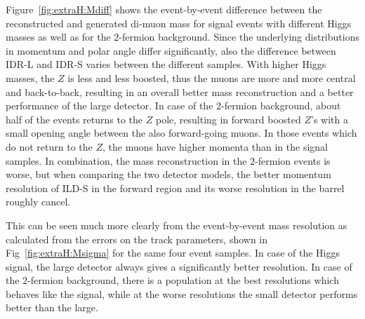Figure~\ref{fig:extraH:Mdiff} shows the event-by-event difference between the reconstructed and generated di-muon mass for signal events with different Higgs masses as well as for the 2-fermion background. Since the underlying distributions in momentum and polar angle differ significantly, also the difference between IDR-L and IDR-S varies between the different samples. With higher Higgs masses, the $Z$ is less and less boosted, thus the muons are more and more central and back-to-back, resulting in an overall better mass reconstruction and a better performance of the large detector. In case of the $2$-fermion background, about half of the events returns to the $Z$ pole, resulting in forward boosted $Z$'s with a small opening angle between the also forward-going muons. In those events which do not return to the $Z$, the muons have higher momenta than in the
signal samples. In combination, the mass reconstruction in the $2$-fermion events is worse, but when comparing
the two detector models, the better momentum resolution of ILD-S in the forward region and its worse resolution
in the barrel roughly cancel.




This can be seen much more clearly from the event-by-event mass resolution as calculated from the errors on 
the track parameters, shown in Fig~\ref{fig:extraH:Msigma} for the same four event samples. In case of the Higgs
signal, the large detector always gives a significantly better resolution. In case of the $2$-fermion background, there is a population at the best resolutions which behaves like the signal, while at the worse
resolutions the small detector performs better than the large.

